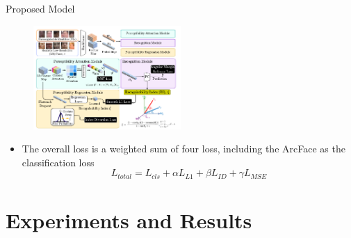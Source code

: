 \documentclass[aspectratio=169,xcolor=dvipsnames]{beamer}
\begin{document}
\begin{frame}{Proposed Model}
    \begin{figure}
        \centering
        \includegraphics[width=0.5\textwidth]{imgs/10_Fig_2_1_Method.png}
        \label{fig:f2-1-method}
    \end{figure}
    \begin{itemize}
        \item The overall loss is a weighted sum of four loss, including the ArcFace as the classification loss
        $$L_{total} = L_{cls} + \alpha L_{L1} + \beta L_{ID} + \gamma L_{MSE}$$
    \end{itemize}
\end{frame}

\section{Experiments and Results}
\end{document}
